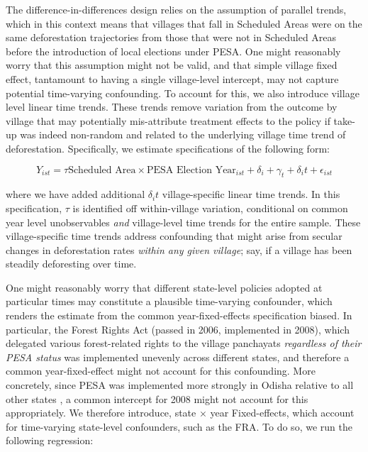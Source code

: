 \documentclass[12pt,reqno]{article}
\begin{document}
The difference-in-differences design relies on the assumption of parallel trends, which in this context means that villages that fall in Scheduled Areas were on the same deforestation trajectories from those that were not in Scheduled Areas before the introduction of local elections under PESA. One might reasonably worry that this assumption might not be valid, and that simple village fixed effect, tantamount to having a single village-level intercept, may not capture potential time-varying confounding. To account for this, we also introduce village level linear time trends. These trends remove variation from the outcome by village that may potentially mis-attribute treatment effects to the policy if take-up was indeed non-random and related to the underlying village time trend of deforestation. Specifically, we estimate specifications of the following form:

\begin{equation}\label{ttrend}
Y_{ist} = \tau \text{Scheduled Area} \times \text{PESA Election Year}_{ist} +
\delta_i + \gamma_t + \delta_it + \epsilon_{ist}
\end{equation}

where we have added additional $\delta_i t$  village-specific linear time trends. In this specification, $\tau$ is identified off within-village variation, conditional on common year level unobservables \emph{and} village-level time trends for the entire sample. These village-specific time trends address confounding that might arise from secular changes in deforestation rates \emph{within any given village}; say, if a village has been steadily deforesting over time. 

One might reasonably worry that different state-level policies adopted at particular times may constitute a plausible time-varying confounder, which renders the estimate from the common year-fixed-effects specification biased. In particular, the Forest Rights Act (passed in 2006, implemented in 2008), which delegated various forest-related rights to the village panchayats \emph{regardless of their PESA status} was implemented unevenly across different states, and therefore a common year-fixed-effect might not account for this confounding. 
More concretely, since PESA was implemented more strongly in Odisha relative to all other states \parencite{Patnaik2007-ku}, a common intercept for 2008 might not account for this appropriately. We therefore introduce, state $\times$ year Fixed-effects, which account for time-varying state-level confounders, such as the FRA. To do so, we run the following regression:
\end{document}
